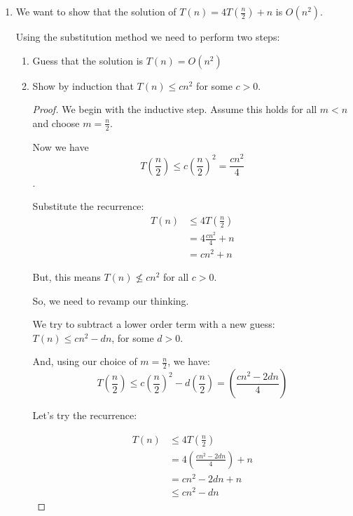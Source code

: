 \documentclass[12pt,letterpaper]{article}
\begin{document}
\begin{enumerate}
\begin{enumerate}
\begin{enumerate}
\begin{proof}
                Since we have no explicit value for $T(0)$,
                we choose $c \ge T(0) + 1$.

                Thus we have shown that the solution holds by induction.
              \end{proof}
          \end{enumerate}

        \item
          We want to show that the solution of $T(n) = 4T\left(\frac{n}{2}\right) + n$ is $O(n^2)$.

          Using the substitution method we need to perform two steps:
          \begin{enumerate}
            \item Guess that the solution is $T(n) = O(n^2)$
            \item Show by induction that $T(n) \le cn^2$ for some $c > 0$.

              \begin{proof} We begin with the inductive step.
                Assume this holds for all $m < n$ and choose $m = \frac{n}{2}$.

                Now we have
                \[T\left(\frac{n}{2}\right) \le c\left(\frac{n}{2}\right)^2 = \frac{cn^2}{4}\].

                Substitute the recurrence:
                \begin{align*}
                  T(n) &\le 4T\left(\frac{n}{2}\right) \\
                  &= 4\frac{cn^2}{4} + n \\
                  &= cn^2 + n
                \end{align*}

                But, this means $T(n) \nleq cn^2$ for all $c > 0$.

                So, we need to revamp our thinking.

                We try to subtract a lower order term with a new guess: $T(n) \le cn^2 - dn$, for some $d > 0$.

                And, using our choice of $m = \frac{n}{2}$, we have:
                \[
                  T\left(\frac{n}{2}\right) \le c\left(\frac{n}{2}\right)^2 - d\left(\frac{n}{2}\right) = \left(\frac{cn^2-2dn}{4}\right)
                \]

                Let's try the recurrence:

                \begin{align*}
                  T(n) &\le 4T\left(\frac{n}{2}\right) \\
                  &= 4\left(\frac{cn^2-2dn}{4}\right) + n \\
                  &= cn^2 - 2dn + n \\
                  &\le cn^2 - dn
                \end{align*}


\end{proof}
\end{enumerate}
\end{enumerate}
\end{enumerate}
\end{document}
